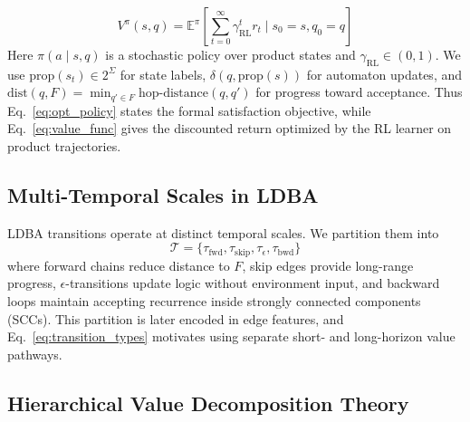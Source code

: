 \documentclass[conference]{IEEEtran}
\begin{document}
\begin{equation}
V^\pi(s,q) = \mathbb{E}^\pi\left[\sum_{t=0}^\infty \gamma_{\text{RL}}^t r_t \mid s_0 = s, q_0 = q\right]
\label{eq:value_func}
\end{equation}
Here $\pi(a\mid s,q)$ is a stochastic policy over product states and $\gamma_{\text{RL}}\in(0,1)$. We use $\text{prop}(s_t)\in2^\Sigma$ for state labels, $\delta(q,\text{prop}(s))$ for automaton updates, and $\text{dist}(q,F)=\min_{q'\in F}\text{hop-distance}(q,q')$ for progress toward acceptance.
Thus Eq.~\ref{eq:opt_policy} states the formal satisfaction objective, while Eq.~\ref{eq:value_func} gives the discounted return optimized by the RL learner on product trajectories.

\subsection{Multi-Temporal Scales in LDBA}

LDBA transitions operate at distinct temporal scales. We partition them into
\begin{equation}
\mathcal{T} = \{\tau_{\text{fwd}}, \tau_{\text{skip}}, \tau_{\epsilon}, \tau_{\text{bwd}}\}
\label{eq:transition_types}
\end{equation}
where forward chains reduce distance to $F$, skip edges provide long-range progress, $\epsilon$-transitions update logic without environment input, and backward loops maintain accepting recurrence inside strongly connected components (SCCs). This partition is later encoded in edge features, and Eq.~\ref{eq:transition_types} motivates using separate short- and long-horizon value pathways.

\subsection{Hierarchical Value Decomposition Theory}
\end{document}
